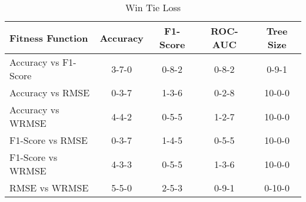 
    \begin{table}[H]
        \centering
        \renewcommand{\arraystretch}{1.2}
        \caption{Win Tie Loss}
        \label{tab:RQ_Fitness_wtl}
    \begin{tabular}{lcccc}
\toprule
Fitness Function & Accuracy & F1-Score & ROC-AUC & Tree Size \\
\midrule
Accuracy vs F1-Score & 3-7-0 & 0-8-2 & 0-8-2 & 0-9-1 \\
Accuracy vs RMSE & 0-3-7 & 1-3-6 & 0-2-8 & 10-0-0 \\
Accuracy vs WRMSE & 4-4-2 & 0-5-5 & 1-2-7 & 10-0-0 \\
F1-Score vs RMSE & 0-3-7 & 1-4-5 & 0-5-5 & 10-0-0 \\
F1-Score vs WRMSE & 4-3-3 & 0-5-5 & 1-3-6 & 10-0-0 \\
RMSE vs WRMSE & 5-5-0 & 2-5-3 & 0-9-1 & 0-10-0 \\
\bottomrule
\end{tabular}

        
    \end{table}
    